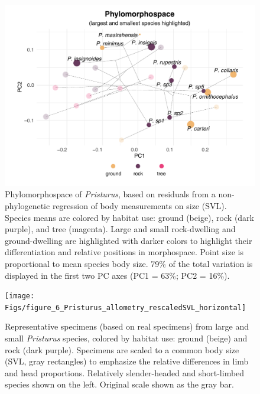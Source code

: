 \documentclass[
  11pt,
]{article}
\begin{document}
\newpage

\begin{figure}

{\centering \includegraphics[width=1\linewidth]{Figs/figure_5_new_phylomorphospace_v2} 

}

\caption{Phylomorphospace of \textit{Pristurus}, based on residuals from a non-phylogenetic regression of body measurements on size (SVL). Species means are colored by habitat use: ground (beige), rock (dark purple), and tree (magenta). Large and small rock-dwelling and ground-dwelling are highlighted with darker colors to highlight their differentiation and relative positions in morphospace. Point size is proportional to mean species body size. 79\% of the total variation is displayed in the first two PC axes (PC1 = 63\%; PC2 = 16\%).}\label{fig:unnamed-chunk-9}
\end{figure}

\newpage

\begin{figure}

{\centering \texttt{[image: Figs/figure\_6\_Pristurus\_allometry\_rescaledSVL\_horizontal]} 

}

\caption{Representative specimens (based on real specimens) from large and small \textit{Pristurus} species, colored by habitat use: ground (beige) and rock (dark purple). Specimens are scaled to a common body size (SVL, gray rectangles) to emphasize the relative differences in limb and head proportions. Relatively slender-headed and short-limbed species shown on the left. Original scale shown as the gray bar.}\label{fig:unnamed-chunk-10}
\end{figure}
\end{document}
